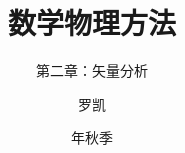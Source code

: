 \documentclass[fontset=fandol,10pt]{ctexbeamer}
\title{数学物理方法}
\subtitle{第二章：矢量分析}
\author{罗凯}
\institute{南京理工大学物理学院}
\date{\zhdigits{2026}年秋季}
\begin{document}
\chaptertitleframe
\chapteroutline

\end{document}
